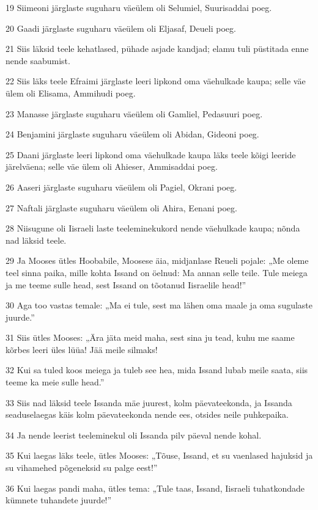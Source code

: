 \par 19 Siimeoni järglaste suguharu väeülem oli Selumiel, Suurisaddai poeg.
\par 20 Gaadi järglaste suguharu väeülem oli Eljasaf, Deueli poeg.
\par 21 Siis läksid teele kehatlased, pühade asjade kandjad; elamu tuli püstitada enne nende saabumist.
\par 22 Siis läks teele Efraimi järglaste leeri lipkond oma väehulkade kaupa; selle väe ülem oli Elisama, Ammihudi poeg.
\par 23 Manasse järglaste suguharu väeülem oli Gamliel, Pedasuuri poeg.
\par 24 Benjamini järglaste suguharu väeülem oli Abidan, Gideoni poeg.
\par 25 Daani järglaste leeri lipkond oma väehulkade kaupa läks teele kõigi leeride järelväena; selle väe ülem oli Ahieser, Ammisaddai poeg.
\par 26 Aaseri järglaste suguharu väeülem oli Pagiel, Okrani poeg.
\par 27 Naftali järglaste suguharu väeülem oli Ahira, Eenani poeg.
\par 28 Niisugune oli Iisraeli laste teeleminekukord nende väehulkade kaupa; nõnda nad läksid teele.
\par 29 Ja Mooses ütles Hoobabile, Moosese äia, midjanlase Reueli pojale: „Me oleme teel sinna paika, mille kohta Issand on öelnud: Ma annan selle teile. Tule meiega ja me teeme sulle head, sest Issand on tõotanud Iisraelile head!”
\par 30 Aga too vastas temale: „Ma ei tule, sest ma lähen oma maale ja oma sugulaste juurde.”
\par 31 Siis ütles Mooses: „Ära jäta meid maha, sest sina ju tead, kuhu me saame kõrbes leeri üles lüüa! Jää meile silmaks!
\par 32 Kui sa tuled koos meiega ja tuleb see hea, mida Issand lubab meile saata, siis teeme ka meie sulle head.”
\par 33 Siis nad läksid teele Issanda mäe juurest, kolm päevateekonda, ja Issanda seaduselaegas käis kolm päevateekonda nende ees, otsides neile puhkepaika.
\par 34 Ja nende leerist teeleminekul oli Issanda pilv päeval nende kohal.
\par 35 Kui laegas läks teele, ütles Mooses: „Tõuse, Issand, et su vaenlased hajuksid ja su vihamehed põgeneksid su palge eest!”
\par 36 Kui laegas pandi maha, ütles tema: „Tule taas, Issand, Iisraeli tuhatkondade kümnete tuhandete juurde!”

